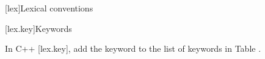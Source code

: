 
[lex]{Lexical conventions}

\setcounter{section}{11}
[lex.key]{Keywords}

\pnum
In C++ [lex.key], add the keyword  to the list of
keywords in Table .
